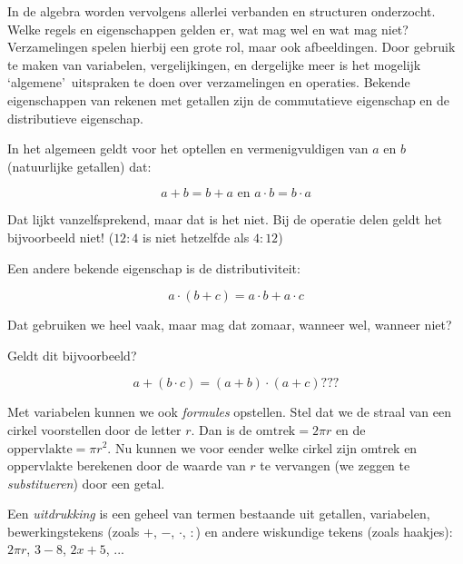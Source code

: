 In de algebra worden vervolgens allerlei verbanden en structuren
onderzocht. Welke regels en eigenschappen gelden er, wat mag wel en
wat mag niet? Verzamelingen spelen hierbij een grote rol, maar ook
afbeeldingen. Door gebruik te maken van variabelen, vergelijkingen,
en dergelijke meer is het mogelijk \textquoteleft algemene\textquoteright \  uitspraken te doen over
verzamelingen en operaties. Bekende eigenschappen van rekenen met
getallen zijn de commutatieve eigenschap en de distributieve eigenschap.

\begin{voorbeeld}
	In het algemeen geldt voor het optellen en vermenigvuldigen
van $a$ en $b$ (natuurlijke getallen) dat:

\begin{equation*}
a + b = b + a \text{ en } a \cdot b = b \cdot a
\end{equation*}

\end{voorbeeld}

Dat lijkt vanzelfsprekend, maar dat is het niet. Bij de operatie delen
geldt het bijvoorbeeld niet! ($12:4$ is niet hetzelfde als $4:12$)

Een andere bekende eigenschap is de distributiviteit:

\begin{equation*}
a \cdot (b + c) = a \cdot b + a \cdot c
\end{equation*}

Dat gebruiken we heel vaak, maar mag dat zomaar, wanneer wel, wanneer
niet?

Geldt dit bijvoorbeeld?

\begin{equation*}
a + (b \cdot c) = (a + b) \cdot (a + c) ???
\end{equation*}




Met variabelen kunnen we ook \emph{formules} opstellen.
Stel dat we de straal van een cirkel voorstellen door de letter $r$.
Dan is de $\mathrm{omtrek}=2\pi r$ en de $\mathrm{oppervlakte}=\pi r^{2}$.
Nu kunnen we voor eender welke cirkel zijn omtrek en oppervlakte berekenen
door de waarde van $r$ te vervangen (we zeggen te \emph{substitueren})
door een getal.




Een \emph{uitdrukking} is een geheel van termen bestaande
uit getallen, variabelen, bewerkingstekens (zoals $+$, $-$, $\cdot$, $:$) en andere
wiskundige tekens (zoals haakjes): $2\pi r$, $3-8$, $2x+5$, ...

